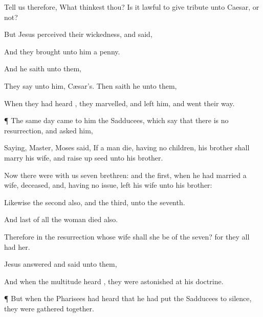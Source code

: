 {Tell
us
therefore,
What
thinkest
thou? Is it
lawful to
give
tribute unto
Caesar,
or
not?

But
Jesus
perceived
their
wickedness, and
said,
{}

And they
brought unto
him a
penny.

And he
saith unto
them,
{}

They
say unto
him,
Cæsar’s.
Then saith
he unto
them,
{}

When they had
heard
{}, they
marvelled,
and
left
him, and went their
way.


\par }{\PP {}¶
The
same
day
came to
him the
Sadducees, which say
that there
is
no
resurrection,
and
asked
him,

Saying,
Master,
Moses
said,
If a
man
die,
having
no
children,
his
brother shall
marry
his
wife,
and raise
up
seed
unto
his
brother.

Now there
were
with
us
seven
brethren:
and the
first, when he had married a
wife,
deceased,
and,
having
no
issue,
left
his
wife
unto
his
brother:

Likewise the
second
also,
and the
third,
unto the
seventh.

And
last of
all the
woman
died
also.

Therefore
in the
resurrection
whose
wife shall she
be of the
seven?
for
they
all
had
her.

Jesus
answered and
said unto
them,
{}




And
when the
multitude
heard
{}, they were
astonished
at
his
doctrine.


\par }{\PP {}¶
But
when the
Pharisees had
heard
that he had
put the
Sadducees to
silence, they were
gathered
together.

}
